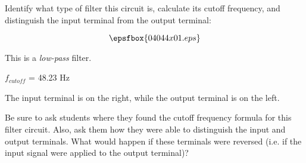 

Identify what type of filter this circuit is, calculate its cutoff frequency, and distinguish the input terminal from the output terminal:

$$\epsfbox{04044x01.eps}$$







This is a {\it low-pass} filter.

\vskip 10pt

$f_{cutoff}$ = 48.23 Hz

\vskip 10pt

The input terminal is on the right, while the output terminal is on the left.







Be sure to ask students where they found the cutoff frequency formula for this filter circuit.  Also, ask them how they were able to distinguish the input and output terminals.  What would happen if these terminals were reversed (i.e. if the input signal were applied to the output terminal)?




